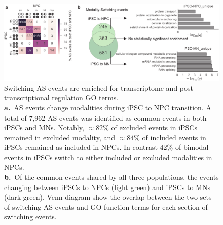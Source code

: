 \begin{figure}[h]
  \centering
  \includegraphics[width=5.8in]{figures/switching_modalities.pdf}
  \caption[Switching AS events are enriched for transcriptome and post-transcriptional regulation GO terms.]{
  Switching AS events are enriched for transcriptome and post-transcriptional regulation GO terms.\\
\textbf{a.}~AS events change modalities during iPSC to NPC transition. A total of 7,962 AS events was identified as common events in both iPSCs and MNs. Notably, $\approx 82\%$ of excluded events in iPSCs remained in excluded modality, and $\approx 84\%$ of included events in iPSCs remained as included in NPCs. In contrast 42\% of bimodal events in iPSCs switch to either included or excluded modalities in NPCs.\\
\textbf{b.}~Of the common events shared by all three populations, the events changing between iPSCs to NPCs (light green) and iPSCs to MNs (dark green). Venn diagram show the overlap between the two sets of switching AS events and GO function terms for each section of switching events.\\
}
\label{fig:switching_modalities}
\end{figure}



